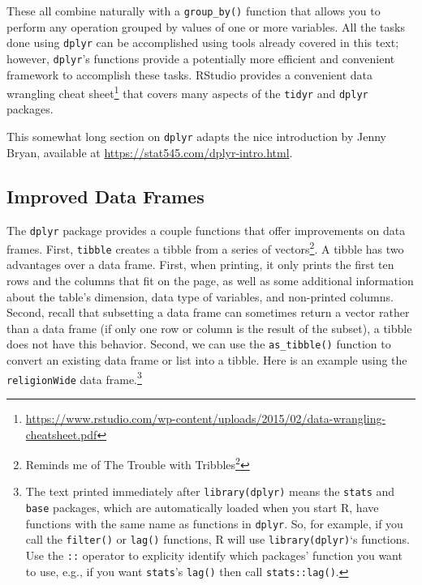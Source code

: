 \documentclass[
]{krantz}
\renewcommand{\href}[2]{#2\footnote{\url{#1}}}
\begin{document}
These all combine naturally with a \texttt{group\_by()} function that allows you to perform any operation grouped by values of one or more variables. All the tasks done using \texttt{dplyr} can be accomplished using tools already covered in this text; however, \texttt{dplyr}'s functions provide a potentially more efficient and convenient framework to accomplish these tasks. RStudio provides a convenient \href{https://www.rstudio.com/wp-content/uploads/2015/02/data-wrangling-cheatsheet.pdf}{data wrangling cheat sheet} that covers many aspects of the \texttt{tidyr} and \texttt{dplyr} packages.

This somewhat long section on \texttt{dplyr} adapts the nice introduction by Jenny Bryan, available at \url{https://stat545.com/dplyr-intro.html}.

\hypertarget{improved-data-frames}{%
\subsection{Improved Data Frames}\label{improved-data-frames}}

The \texttt{dplyr} package provides a couple functions that offer improvements on data frames. First, \texttt{tibble} creates a tibble from a series of vectors\footnote{Reminds me of \href{https://en.wikipedia.org/wiki/The_Trouble_with_Tribbles}{The Trouble with Tribbles}}. A tibble has two advantages over a data frame. First, when printing, it only prints the first ten rows and the columns that fit on the page, as well as some additional information about the table's dimension, data type of variables, and non-printed columns. Second, recall that subsetting a data frame can sometimes return a vector rather than a data frame (if only one row or column is the result of the subset), a tibble does not have this behavior. Second, we can use the \texttt{as\_tibble()} function to convert an existing data frame or list into a tibble. Here is an example using the \texttt{religionWide} data frame.\footnote{The text printed immediately after \texttt{library(dplyr)} means the \texttt{stats} and \texttt{base} packages, which are automatically loaded when you start R, have functions with the same name as functions in \texttt{dplyr}. So, for example, if you call the \texttt{filter()} or \texttt{lag()} functions, R will use \texttt{library(dplyr)}`s functions. Use the \texttt{::} operator to explicity identify which packages' function you want to use, e.g., if you want \texttt{stats}'s \texttt{lag()} then call \texttt{stats::lag()}.}
\end{document}
